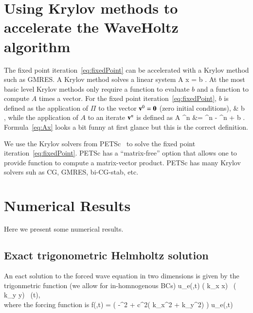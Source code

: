 \documentclass[preprint,11pt]{elsarticle}
\begin{document}
\section{Using Krylov methods to accelerate the WaveHoltz algorithm} \label{sec:KrylovAcceleration} 

The fixed point iteration~\eqref{eq:fixedPoint} can be accelerated with a Krylov
method such as GMRES.
A Krylov method solves a linear system
\ba
    A x = b .
\ea
At the most basic level Krylov methods only require a function to evaluate $b$ and a function
to compute $A$ times a vector.
For the fixed point iteration~\eqref{eq:fixedPoint}, $b$ is defined as the application of $\Pi$ to
the vector $\mathbf{ v}^0=\mathbf{0}$ (zero initial conditions),
\ba
&      b \eqdef \Pi\, \zerov,
\ea
while the application of $A$ to an iterate $\mathbf{ v}^n$ is defined as 
\ba
  A \vv^n &=  \vv^n - \Pi\vv^n + b .   \label{eq:Ax}
\ea
Formula~\eqref{eq:Ax} looks a bit funny at first glance but this is the correct definition.

We use the Krylov solvers from PETSc~\cite{petsc} to solve the fixed point iteration~\eqref{eq:fixedPoint}.
PETSc has a ``matrix-free'' option that allows one to provide function to compute
a matrix-vector product. PETSc has many Krylov solvers suh as CG, GMRES, bi-CG-stab, etc.


\section{Numerical Results} \label{sec:numericalResults}

Here we present some numerical results.


\subsection{Exact trigonometric Helmholtz solution} \label{sec:trigHelmholtz}

An eact solution to the forced wave equation in two dimensions is
given by the trigonmetric function (we allow for in-homnogenous BCs)
\bas
   u_e(\xv,t) \eqdef \sin( k_x x) \, \sin( k_y y) \, \cos(\omega t), \\
\eas
where the forcing function is
\bas
  f(\xv,t) = \Big( -\omega^2 + c^2( k_x^2 + k_y^2) \Big) u_e(\xv,t)
\eas
\end{document}
